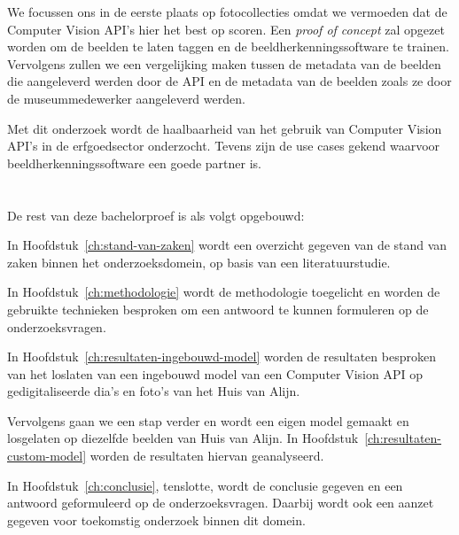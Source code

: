 We focussen ons in de eerste plaats op fotocollecties omdat we vermoeden dat de Computer Vision API’s hier het best op scoren. Een \textit{proof of concept} zal opgezet worden om de beelden te laten taggen en de beeldherkenningssoftware te trainen. Vervolgens zullen we een vergelijking maken tussen de metadata van de beelden die aangeleverd werden door de API en de metadata van de beelden zoals ze door de museummedewerker aangeleverd werden.

Met dit onderzoek wordt de haalbaarheid van het gebruik van Computer Vision API’s in de erfgoedsector onderzocht. Tevens zijn de use cases gekend waarvoor beeldherkenningssoftware een goede partner is. 

\section{}
\label{sec:opzet-bachelorproef}


De rest van deze bachelorproef is als volgt opgebouwd:

In Hoofdstuk~\ref{ch:stand-van-zaken} wordt een overzicht gegeven van de stand van zaken binnen het onderzoeksdomein, op basis van een literatuurstudie.

In Hoofdstuk~\ref{ch:methodologie} wordt de methodologie toegelicht en worden de gebruikte technieken besproken om een antwoord te kunnen formuleren op de onderzoeksvragen.

In Hoofdstuk~\ref{ch:resultaten-ingebouwd-model} worden de resultaten besproken van het loslaten van een ingebouwd model van een Computer Vision API op gedigitaliseerde dia's en foto's van het Huis van Alijn.

Vervolgens gaan we een stap verder en wordt een eigen model gemaakt en losgelaten op diezelfde beelden van Huis van Alijn. In Hoofdstuk~\ref{ch:resultaten-custom-model} worden de resultaten hiervan geanalyseerd.

In Hoofdstuk~\ref{ch:conclusie}, tenslotte, wordt de conclusie gegeven en een antwoord geformuleerd op de onderzoeksvragen. Daarbij wordt ook een aanzet gegeven voor toekomstig onderzoek binnen dit domein.